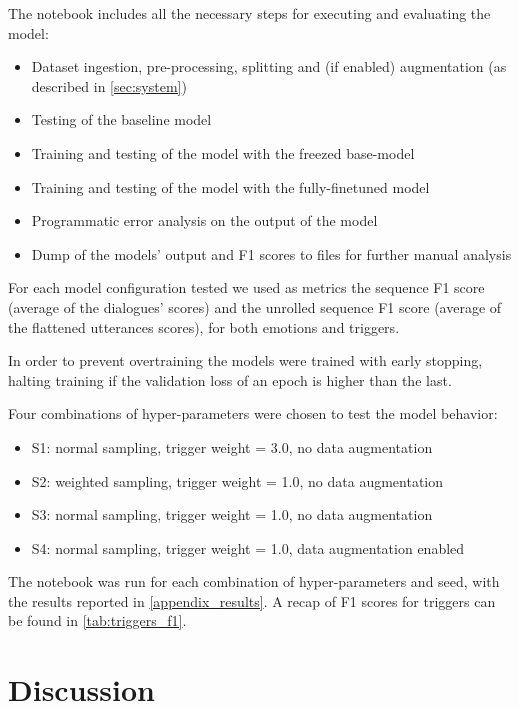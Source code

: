 \documentclass[11pt,table,xcdraw]{article}
\begin{document}
The notebook includes all the necessary steps for executing and evaluating the model:
\begin{itemize}
    \item Dataset ingestion, pre-processing, splitting and (if enabled) augmentation (as described in \ref{sec:system})
    \item Testing of the baseline model
    \item Training and testing of the model with the freezed base-model
    \item Training and testing of the model with the fully-finetuned model
    \item Programmatic error analysis on the output of the model
    \item Dump of the models' output and F1 scores to files for further manual analysis
\end{itemize}

For each model configuration tested we used as metrics the sequence F1 score (average of the dialogues' scores) and the unrolled sequence F1 score (average of the flattened utterances scores), for both emotions and triggers.

In order to prevent overtraining the models were trained with early stopping, halting training if the validation loss of an epoch is higher than the last.

Four combinations of hyper-parameters were chosen to test the model behavior:
\begin{itemize}
    \item S1: normal sampling, trigger weight = 3.0, no data augmentation
    \item S2: weighted sampling, trigger weight = 1.0, no data augmentation
    \item S3: normal sampling, trigger weight = 1.0, no data augmentation
    \item S4: normal sampling, trigger weight = 1.0, data augmentation enabled
\end{itemize}

The notebook was run for each combination of hyper-parameters and seed, with the results reported in \autoref{appendix_results}. A recap of F1 scores for triggers can be found in \autoref{tab:triggers_f1}.




\section{Discussion}
\end{document}
